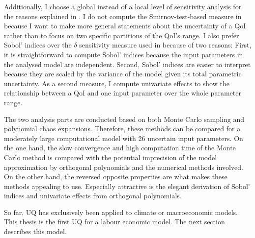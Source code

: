 \documentclass[a4paper,12pt]{article}
\begin{document}
Additionally, I choose a global instead of a local level of sensitivity analysis for the reasons explained in \cite{Harenberg.2019}. I do not compute the Smirnov-test-based measure in \cite{Ratto.2008} because I want to make more general statements about the uncertainty of a QoI rather than to focus on two specific partitions of the QoI's range. I also prefer Sobol' indices over the $\delta$ sensitivity measure used in \cite{Anderson.2014} because of two reasons:  First, it is straightforward to compute Sobol' indices because the input parameters in the analysed model are independent. Second, Sobol' indices are easier to interpret because they are scaled by the variance of the model given its total parametric uncertainty. As a second measure, I compute univariate effects to show the relationship between a QoI and one input parameter over the whole parameter range.

The two analysis parts are conducted based on both Monte Carlo sampling and polynomial chaos expansions. Therefore, these methods can be compared for a moderately large computational model with 26 uncertain input parameters. On the one hand, the slow convergence and high computation time of the Monte Carlo method is compared with the potential imprecision of the model approximation by orthogonal polynomials and the numerical methods involved. On the other hand, the reversed opposite properties are what makes these methods appealing to use. Especially attractive is the elegant derivation of Sobol' indices and univariate effects from orthogonal polynomials.

So far, UQ has exclusively been applied to climate or macroeconomic models. This thesis is the first UQ for a labour economic model. The next section describes this model.

\newpage

\end{document}
